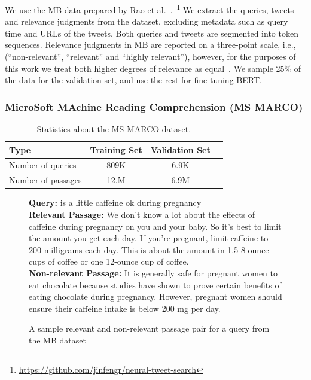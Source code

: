 We use the MB data prepared by Rao et al.~\cite{rao2019tweet}.~\footnote{\url{https://github.com/jinfengr/neural-tweet-search}}
We extract the queries, tweets and relevance judgments from the dataset, excluding metadata such as query time and URLs of the tweets.
Both queries and tweets are segmented into token sequences.
Relevance judgments in MB are reported on a three-point scale, i.e., (``non-relevant'', ``relevant'' and ``highly relevant''), however, for the purposes of this work we treat both higher degrees of relevance as equal~\cite{ounisoverview}.
We sample 25\% of the data for the validation set, and use the rest for fine-tuning BERT.

\subsubsection{MicroSoft MAchine Reading Comprehension (MS MARCO)}

\begin{table}[b]
\vspace{0.2cm}
\centering
\begin{tabular}{lccc}
\toprule
\textbf{Type} \mbox{\hspace{0.5cm}} & \textbf{Training Set} \mbox{\hspace{1.0cm}} & \textbf{Validation Set} \mbox{\hspace{1.0cm}} \\
\toprule
Number of queries & 809K & 6.9K \\
Number  of passages & 12.M & 6.9M \\
\bottomrule
\end{tabular}
\vspace{0.2cm}
\caption{Statistics about the MS MARCO dataset.}
\label{tab:marco-stats}
\end{table}

\begin{figure}[b!]
	\begin{framed}
    		\textbf{Query:} is a little caffeine ok during pregnancy \\
    		\textbf{Relevant Passage:} We don't know a lot about the effects of caffeine during pregnancy on you and your baby. So it's best to limit the amount you get each day. If you're pregnant, limit caffeine to 200 milligrams each day. This is about the amount in 1.5 8-ounce cups of coffee or one 12-ounce cup of coffee. \\
    		\textbf{Non-relevant Passage:} It is generally safe for pregnant women to eat chocolate because studies have shown to prove certain benefits of eating chocolate during pregnancy. However, pregnant women should ensure their caffeine intake is below 200 mg per day. \\
	\end{framed}
\label{marco-example}
 \caption{A sample relevant and non-relevant passage pair for a query from the MB dataset}
\end{figure}


